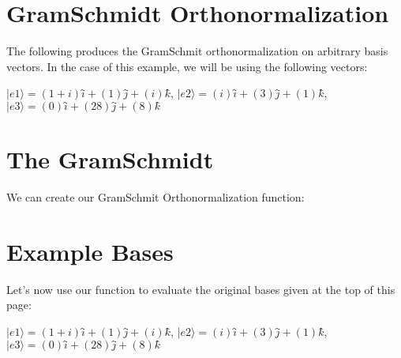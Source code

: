 \documentclass[letterpaper,10pt,english]{jupyterBook}
\begin{document}
\chapter{Gram\sphinxhyphen{}Schmidt Orthonormalization}
\label{\detokenize{gram-schmit:gram-schmidt-orthonormalization}}\label{\detokenize{gram-schmit::doc}}
\sphinxAtStartPar
The following produces the Gram\sphinxhyphen{}Schmit orthonormalization on arbitrary basis vectors. In the case of this example, we will be using the following vectors:

\sphinxAtStartPar
\(|𝑒1⟩=(1+𝑖)𝑖̂+(1)𝑗̂+(𝑖)𝑘̂\), \(|𝑒2⟩=(𝑖)𝑖̂+(3)𝑗̂+(1)𝑘̂\), \(|𝑒3⟩=(0)𝑖̂+(28)𝑗̂+(8)𝑘̂\)


\chapter{The Gram\sphinxhyphen{}Schmidt}
\label{\detokenize{gram-schmit:the-gram-schmidt}}
\sphinxAtStartPar
We can create our Gram\sphinxhyphen{}Schmit Orthonormalization function:

\begin{sphinxVerbatim}[commandchars=\\\{\}]
   
 
      \PYG{p}{[}\PYG{p}{]}
       
                   
          
     
\end{sphinxVerbatim}


\chapter{Example Bases}
\label{\detokenize{gram-schmit:example-bases}}
\sphinxAtStartPar
Let’s now use our  function to evaluate the original bases given at the top of this page:

\sphinxAtStartPar
\(|𝑒1⟩=(1+𝑖)𝑖̂+(1)𝑗̂+(𝑖)𝑘̂\), \(|𝑒2⟩=(𝑖)𝑖̂+(3)𝑗̂+(1)𝑘̂\), \(|𝑒3⟩=(0)𝑖̂+(28)𝑗̂+(8)𝑘̂\)
\end{document}
